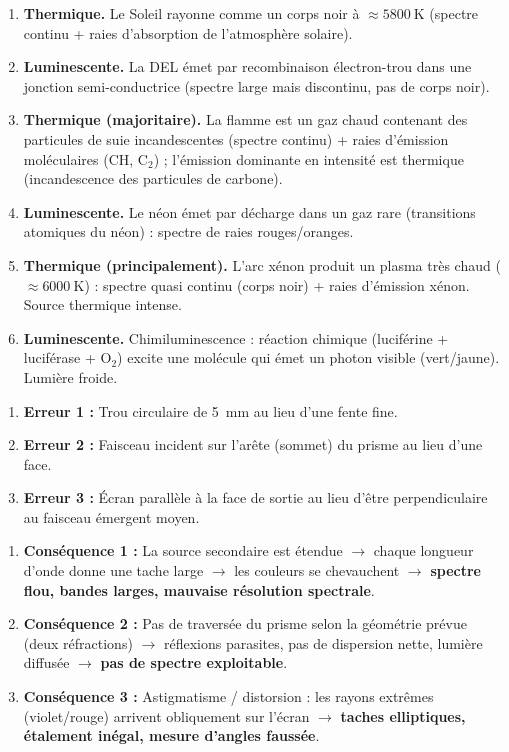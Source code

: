 \documentclass[11pt]{article}
\begin{document}
\begin{corrige}
\begin{enumerate}
    \item \textbf{Thermique.} Le Soleil rayonne comme un corps noir à $\approx \SI{5800}{\kelvin}$ (spectre continu + raies d'absorption de l'atmosphère solaire).
    \item \textbf{Luminescente.} La DEL émet par recombinaison électron-trou dans une jonction semi-conductrice (spectre large mais discontinu, pas de corps noir).
    \item \textbf{Thermique (majoritaire).} La flamme est un gaz chaud contenant des particules de suie incandescentes (spectre continu) + raies d'émission moléculaires (CH, C$_2$) ; l'émission dominante en intensité est thermique (incandescence des particules de carbone).
    \item \textbf{Luminescente.} Le néon émet par décharge dans un gaz rare (transitions atomiques du néon) : spectre de raies rouges/oranges.
    \item \textbf{Thermique (principalement).} L'arc xénon produit un plasma très chaud ($\approx \SI{6000}{\kelvin}$) : spectre quasi continu (corps noir) + raies d'émission xénon. Source thermique intense.
    \item \textbf{Luminescente.} Chimiluminescence : réaction chimique (luciférine + luciférase + O$_2$) excite une molécule qui émet un photon visible (vert/jaune). Lumière froide.
\end{enumerate}
\end{corrige}

\begin{corrige}
\begin{enumerate}
    \item \textbf{Erreur 1 :} Trou circulaire de \SI{5}{\milli\meter} au lieu d'une fente fine.
    \item \textbf{Erreur 2 :} Faisceau incident sur l'arête (sommet) du prisme au lieu d'une face.
    \item \textbf{Erreur 3 :} Écran parallèle à la face de sortie au lieu d'être perpendiculaire au faisceau émergent moyen.
\end{enumerate}
\begin{enumerate}
    \item \textbf{Conséquence 1 :} La source secondaire est étendue $\to$ chaque longueur d'onde donne une tache large $\to$ les couleurs se chevauchent $\to$ \textbf{spectre flou, bandes larges, mauvaise résolution spectrale}.
    \item \textbf{Conséquence 2 :} Pas de traversée du prisme selon la géométrie prévue (deux réfractions) $\to$ réflexions parasites, pas de dispersion nette, lumière diffusée $\to$ \textbf{pas de spectre exploitable}.
    \item \textbf{Conséquence 3 :} Astigmatisme / distorsion : les rayons extrêmes (violet/rouge) arrivent obliquement sur l'écran $\to$ \textbf{taches elliptiques, étalement inégal, mesure d'angles faussée}.
\end{enumerate}
\end{corrige}
\end{document}
